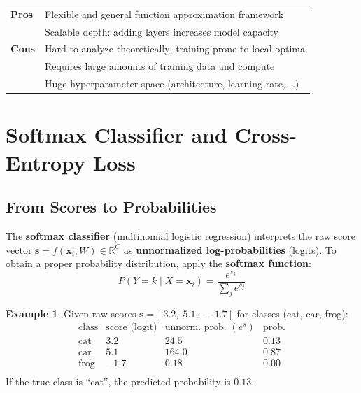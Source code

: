 \documentclass[11pt,a4paper]{article}
\theoremstyle{definition}
\newtheorem{example}{Example}[section]
\theoremstyle{plain}
\theoremstyle{remark}
\begin{document}
\begin{tcolorbox}[colback=blue!5!white,colframe=blue!75!black,title=\textbf{Neural Networks: Pros and Cons}]
\begin{tabular}{ll}
    \textbf{Pros} & Flexible and general function approximation framework \\
                  & Scalable depth: adding layers increases model capacity \\[4pt]
    \textbf{Cons} & Hard to analyze theoretically; training prone to local optima \\
                  & Requires large amounts of training data and compute \\
                  & Huge hyperparameter space (architecture, learning rate, \ldots) \\
\end{tabular}
\end{tcolorbox}


\section{Softmax Classifier and Cross-Entropy Loss}

\subsection{From Scores to Probabilities}

The \textbf{softmax classifier} (multinomial logistic regression) interprets the raw score vector $\mathbf{s} = f(\mathbf{x}_i; W) \in \mathbb{R}^C$ as \textbf{unnormalized log-probabilities} (logits).
To obtain a proper probability distribution, apply the \textbf{softmax function}:
\[
    P(Y = k \mid X = \mathbf{x}_i) = \frac{e^{s_k}}{\displaystyle\sum_j e^{s_j}}
\]

\begin{example}
Given raw scores $\mathbf{s} = [3.2,\; 5.1,\; -1.7]$ for classes (cat, car, frog):
\[
\begin{array}{l|r|r|r} %
    \text{class} & \text{score (logit)} & \text{unnorm.\ prob.\ } (e^s) & \text{prob.} \\
    \hline
    \text{cat}  & 3.2  & 24.5  & 0.13 \\
    \text{car}  & 5.1  & 164.0 & 0.87 \\
    \text{frog} & -1.7 & 0.18  & 0.00 \\
\end{array}
\]
If the true class is ``cat'', the predicted probability is $0.13$.
\end{example}
\end{document}
